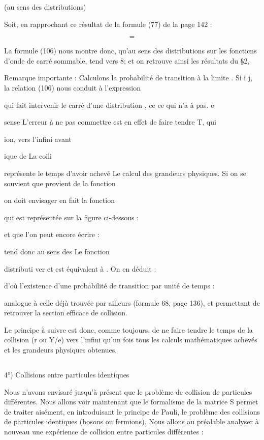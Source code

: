 (au sens
des distributions)

Soit, en rapprochant ce résultat de la formule (77) de la page 142 :

\[
\tag{106}=
\]


La formule (106) nous montre donc, qu'au sens des
distributions sur les foncticns d'onde de carré sommable,
 tend vers 8; et on retrouve ainsi les résultats du \S 2,

Remarque  importante : Calculons la probabilité de transition
 à la limite . Si i  j, la relation
(106) nous conduit à l'expression

qui fait intervenir le carré d'une distribution , ce ce qui n'a à pas. e

sense L'erreur à ne pas commettre est en effet de faire tendre T, qui

ion, vers l'infini avant

ique de La coili

représente le temps
d'avoir achevé Le calcul des grandeurs physiques.
Si on se souvient que  provient de la fonction

 on doit envisager en fait la fonction

qui est représentée sur la figure ci-dessous :


et que l'on peut encore écrire :

tend donc au sens des
Le fonction

distributi ver et est équivalent à .
On en déduit :

d'où l'existence d'une probabilité de transition par unité de
temps :

analogue à celle déjà trouvée par ailleurs (formule 68, page 136),
et permettant de retrouver la section efficace de collision.

Le principe à suivre est donc, comme toujours, de ne faire tendre
le temps de la collision (r ou Y/e) vers l'infini qu'un fois tous
les calculs mathématiques achevés et les grandeurs physiques obtenues,

\subsection{}%
4°) Collisions entre particules identiques

Nous n'avons envisaré jusqu'à présent que le problème de
collision de particules différentes. Nous allons voir maintenant
que le formalisme de la matrice S permet de traiter aisément, en introduisant le
principe de Pauli, le problème des collisions de particules identiques (bosons ou
fermions). Nous allons au préalable
analyser à nouveau une expérience de collision entre particules différentes :
